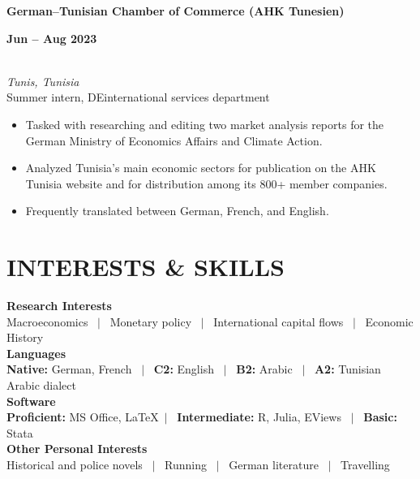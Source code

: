 \documentclass[a4paper,9pt]{extarticle}
\begin{document}
\noindent
\begin{minipage}[t]{0.7\textwidth}
  \textbf{German--Tunisian Chamber of Commerce (AHK Tunesien)}
\end{minipage}
\begin{minipage}[t]{0.3\textwidth}
  \raggedleft \textbf{Jun -- Aug 2023}
\end{minipage}
\\
\textit{Tunis, Tunisia} \\ 
Summer intern, DEinternational services department 
\begin{itemize}[noitemsep, topsep=0pt, left=0.65cm]
    \item Tasked with researching and editing two market analysis reports for the German Ministry of Economics Affairs and Climate Action.
    \item Analyzed Tunisia's main economic sectors for publication on the AHK Tunisia website and for distribution among its 800+ member companies. 
    \item Frequently translated between German, French, and English. \\
\end{itemize} 


\section*{INTERESTS \& SKILLS}

\noindent
\newline
\textbf{Research Interests} \\
Macroeconomics \ $|$ \ Monetary policy \ $|$ \ International capital flows \ $|$ \ Economic History \\

\noindent
\textbf{Languages} \\
\textbf{Native:} German, French \ $|$ \ \textbf{C2:} English \ $|$ \ \textbf{B2:} Arabic \ $|$ \ \textbf{A2:} Tunisian Arabic dialect \\

\noindent
\textbf{Software} \\
\textbf{Proficient:} MS Office, \LaTeX \ $|$ \ \textbf{Intermediate:} R, Julia, EViews \ $|$ \ \textbf{Basic:} Stata  \\

\noindent
\textbf{Other Personal Interests} \\
Historical and police novels \ $|$ \ Running \ $|$ \ German literature \ $|$ \ Travelling  \\
\end{document}

